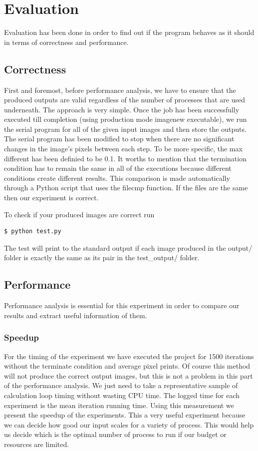 \documentclass[12pt,a4paper]{article}
\begin{document}
\section{Evaluation}
    Evaluation has been done in order to find out if the program behaves as it should in terms of correctness and performance.

    \subsection{Correctness}
        First and foremost, before performance analysis, we have to ensure that the produced outputs are valid regardless of the number of processes that are used underneath. The approach is very simple. Once the job has been successfully executed till completion (using production mode imagenew executable), we run the serial program for all of the given input images and then store the outputs. The serial program has been modified to stop when there are no significant changes in the image's pixels between each step. To be more specific, the max different has been definied to be 0.1. It worths to mention that the termination condition has to remain the same in all of the executions because different conditions create different results. This comparison is made automatically through a Python script that uses the filecmp function. If the files are the same then our experiment is correct.

        To check if your produced images are correct run
        \begin{lstlisting}[language=bash]
          $ python test.py
        \end{lstlisting}

        The test will print to the standard output if each image produced in the output/ folder is exactly the same as its pair in the test\_output/ folder.

    \subsection{Performance}
        Performance analysis is essential for this experiment in order to compare our results and extract useful information of them.

        \subsubsection{Speedup}
          For the timing of the experiment we have executed the project for 1500 iterations without the terminate condition and average pixel prints. Of course this method will not produce the correct output images, but this is not a problem in this part of the performance analysis. We just need to take a representative sample of calculation loop timing without wasting CPU time. The logged time for each experiment is the mean iteration running time. Using this measurement we present the speedup of the experiments. This a very useful experiment because we can decide how good our input scales for a variety of process. This would help us decide which is the optimal number of process to run if our budget or resources are limited.
\end{document}
